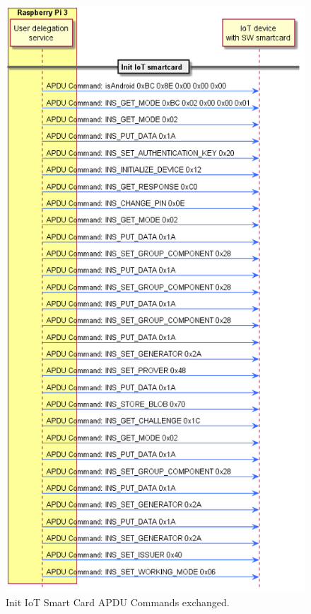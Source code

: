 \begin{figure}[bth]
	\begin{center}
		\includegraphics[width=0.9\linewidth]{gfx/APDUsInitIoTSC}
	\end{center}
	\caption{Init IoT Smart Card APDU Commands exchanged.}
	\label{fig:APDUsInitIoTSC}
\end{figure}

